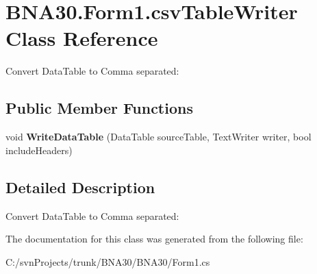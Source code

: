 \hypertarget{class_b_n_a30_1_1_form1_1_1csv_table_writer}{}\section{B\+N\+A30.\+Form1.\+csv\+Table\+Writer Class Reference}
\label{class_b_n_a30_1_1_form1_1_1csv_table_writer}


Convert Data\+Table to Comma separated\+:  


\subsection*{Public Member Functions}
\begin{DoxyCompactItemize}
\item 
\mbox{\label{class_b_n_a30_1_1_form1_1_1csv_table_writer_a83213e13c8da84b54a76474f80671524}} 
void {\bfseries Write\+Data\+Table} (Data\+Table source\+Table, Text\+Writer writer, bool include\+Headers)
\end{DoxyCompactItemize}


\subsection{Detailed Description}
Convert Data\+Table to Comma separated\+: 



The documentation for this class was generated from the following file\+:\begin{DoxyCompactItemize}
\item 
C\+:/svn\+Projects/trunk/\+B\+N\+A30/\+B\+N\+A30/Form1.\+cs\end{DoxyCompactItemize}
